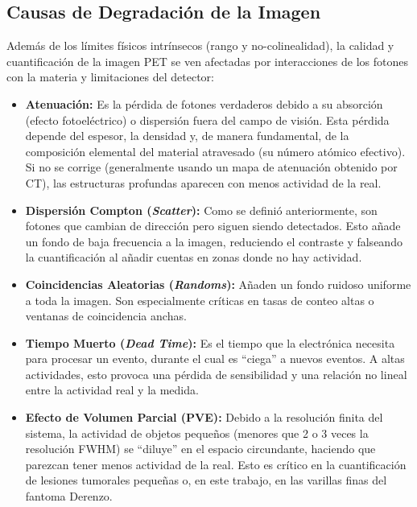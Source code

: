 \subsection{Causas de Degradación de la Imagen}

Además de los límites físicos intrínsecos (rango y no-colinealidad), la calidad y cuantificación de la imagen PET se ven afectadas por interacciones de los fotones con la materia y limitaciones del detector:

\begin{itemize}
      \item \textbf{Atenuación:} Es la pérdida de fotones verdaderos debido a su absorción (efecto fotoeléctrico) o dispersión fuera del campo de visión. Esta pérdida depende del espesor, la densidad y, de manera fundamental, de la composición elemental del material atravesado (su número atómico efectivo). Si no se corrige (generalmente usando un mapa de atenuación obtenido por CT), las estructuras profundas aparecen con menos actividad de la real.

      \item \textbf{Dispersión Compton (\emph{Scatter}):} Como se definió anteriormente, son fotones que cambian de dirección pero siguen siendo detectados. Esto añade un fondo de baja frecuencia a la imagen, reduciendo el contraste y falseando la cuantificación al añadir cuentas en zonas donde no hay actividad.

      \item \textbf{Coincidencias Aleatorias (\emph{Randoms}):} Añaden un fondo ruidoso uniforme a toda la imagen. Son especialmente críticas en tasas de conteo altas o ventanas de coincidencia anchas.

      \item \textbf{Tiempo Muerto (\emph{Dead Time}):} Es el tiempo que la electrónica necesita para procesar un evento, durante el cual es \enquote{ciega} a nuevos eventos. A altas actividades, esto provoca una pérdida de sensibilidad y una relación no lineal entre la actividad real y la medida.

      \item \textbf{Efecto de Volumen Parcial (PVE):} Debido a la resolución finita del sistema, la actividad de objetos pequeños (menores que 2 o 3 veces la resolución FWHM) se \enquote{diluye} en el espacio circundante, haciendo que parezcan tener menos actividad de la real. Esto es crítico en la cuantificación de lesiones tumorales pequeñas o, en este trabajo, en las varillas finas del fantoma Derenzo.
\end{itemize}


